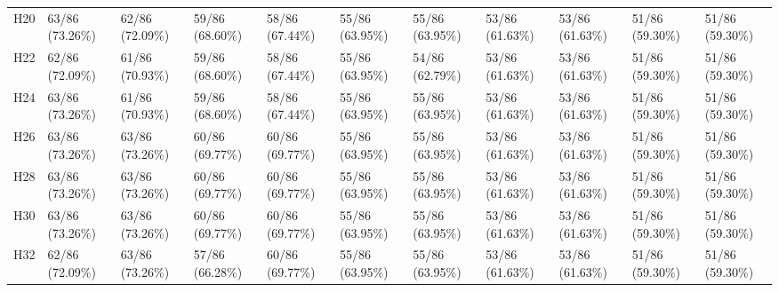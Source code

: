 \begin{table}[tbp]
\begin{tabular}{lllllllllll}
H20 & 63/86 (73.26\%) & 62/86 (72.09\%) & 59/86 (68.60\%) & 58/86 (67.44\%) & 55/86 (63.95\%) & 55/86 (63.95\%) & 53/86 (61.63\%) & 53/86 (61.63\%) & 51/86 (59.30\%) & 51/86 (59.30\%) \\
H22 & 62/86 (72.09\%) & 61/86 (70.93\%) & 59/86 (68.60\%) & 58/86 (67.44\%) & 55/86 (63.95\%) & 54/86 (62.79\%) & 53/86 (61.63\%) & 53/86 (61.63\%) & 51/86 (59.30\%) & 51/86 (59.30\%) \\
H24 & 63/86 (73.26\%) & 61/86 (70.93\%) & 59/86 (68.60\%) & 58/86 (67.44\%) & 55/86 (63.95\%) & 55/86 (63.95\%) & 53/86 (61.63\%) & 53/86 (61.63\%) & 51/86 (59.30\%) & 51/86 (59.30\%) \\
H26 & 63/86 (73.26\%) & 63/86 (73.26\%) & 60/86 (69.77\%) & 60/86 (69.77\%) & 55/86 (63.95\%) & 55/86 (63.95\%) & 53/86 (61.63\%) & 53/86 (61.63\%) & 51/86 (59.30\%) & 51/86 (59.30\%) \\
H28 & 63/86 (73.26\%) & 63/86 (73.26\%) & 60/86 (69.77\%) & 60/86 (69.77\%) & 55/86 (63.95\%) & 55/86 (63.95\%) & 53/86 (61.63\%) & 53/86 (61.63\%) & 51/86 (59.30\%) & 51/86 (59.30\%) \\
H30 & 63/86 (73.26\%) & 63/86 (73.26\%) & 60/86 (69.77\%) & 60/86 (69.77\%) & 55/86 (63.95\%) & 55/86 (63.95\%) & 53/86 (61.63\%) & 53/86 (61.63\%) & 51/86 (59.30\%) & 51/86 (59.30\%) \\
H32 & 62/86 (72.09\%) & 63/86 (73.26\%) & 57/86 (66.28\%) & 60/86 (69.77\%) & 55/86 (63.95\%) & 55/86 (63.95\%) & 53/86 (61.63\%) & 53/86 (61.63\%) & 51/86 (59.30\%) & 51/86 (59.30\%) \\
\bottomrule
\end{tabular}
\end{table}
